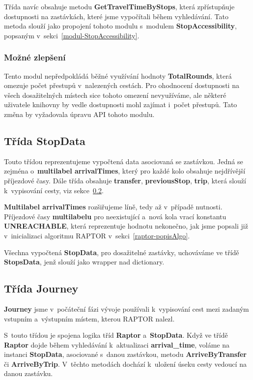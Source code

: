 Třída navíc obsahuje metodu \textbf{GetTravelTimeByStops}, která zpřístupňuje dostupnosti na zastávkách, které jsme vypočítali během vyhledávání. Tato metoda slouží jako propojení tohoto modulu s~modulem \textbf{StopAccessibility}, popsaným v~sekci~\ref{modul-StopAccessibility}.

\subsubsection{Možné zlepšení}

Tento modul nepředpokládá běžné využívání hodnoty \textbf{TotalRounds}, která omezuje počet přestupů v~nalezených cestách. Pro ohodnocení dostupnosti na všech dosažitelných místech sice tohoto omezení nevyužíváme, ale některé uživatele knihovny by vedle dostupnosti mohl zajímat i~počet přestupů. Tato změna by vyžadovala úpravu API tohoto modulu.


\subsection{Třída StopData}

Touto třídou reprezentujeme vypočtená data asociovaná se zastávkou. Jedná se zejména o~\textbf{multilabel arrivalTimes}, který pro každé kolo obsahuje nejdřívější příjezdové časy. Dále třída obsahuje \textbf{transfer}, \textbf{previousStop}, \textbf{trip}, která slouží k~vypisování cesty, viz sekce~\ref{RaptorAlgo-journey}.

\textbf{Multilabel arrivalTimes} rozšiřujeme líně, tedy až v~případě nutnosti. Příjezdové časy \textbf{multilabelu} pro neexistující a~nová kola vrací konstantu \textbf{UNREACHABLE}, která reprezentuje hodnotu nekonečno, jak jsme popsali již v~inicializaci algoritmu RAPTOR v~sekci~\ref{raptor-popisAlgo}.

Všechna vypočtená \textbf{StopData}, pro dosažitelné zastávky, uchováváme ve třídě \textbf{StopsData}, jenž slouží jako wrapper nad dictionary.


\subsection{Třída Journey} \label{RaptorAlgo-journey}

\textbf{Journey} jsme v~počáteční fázi vývoje používali k~vypisování cest mezi zadaným vstupním a~výstupním místem, kterou RAPTOR nalezl.

S~touto třídou je spojena logika tříd \textbf{Raptor} a~\textbf{StopData}. Když ve třídě \textbf{Raptor} dojde během vyhledávání k~aktualizaci \textbf{arrival\_time}, voláme na instanci \textbf{StopData}, asociované s~danou zastávkou, metodu \textbf{ArriveByTransfer} či \textbf{ArriveByTrip}. V~těchto metodách dochází k~uložení úseku cesty vedoucí na danou zastávku.

